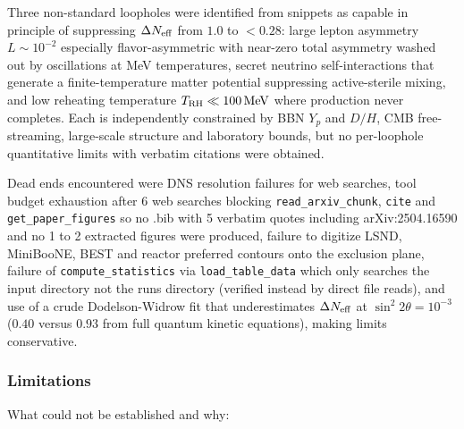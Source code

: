 \documentclass[11pt,a4paper]{article}
\begin{document}
Three non-standard loopholes were identified from snippets as capable in principle of suppressing $\Delta N_{\rm eff}$ from $1.0$ to $<0.28$: large lepton asymmetry $L \sim 10^{-2}$ especially flavor-asymmetric with near-zero total asymmetry washed out by oscillations at MeV temperatures, secret neutrino self-interactions that generate a finite-temperature matter potential suppressing active-sterile mixing, and low reheating temperature $T_{\rm RH} \ll 100\,\mathrm{MeV}$ where production never completes. Each is independently constrained by BBN $Y_p$ and $D/H$, CMB free-streaming, large-scale structure and laboratory bounds, but no per-loophole quantitative limits with verbatim citations were obtained.

Dead ends encountered were DNS resolution failures for web searches, tool budget exhaustion after 6 web searches blocking \texttt{read\_\allowbreak{}arxiv\_\allowbreak{}chunk}, \texttt{cite} and \texttt{get\_\allowbreak{}paper\_\allowbreak{}figures} so no .bib with 5 verbatim quotes including arXiv:2504.16590 and no 1 to 2 extracted figures were produced, failure to digitize LSND, MiniBooNE, BEST and reactor preferred contours onto the exclusion plane, failure of \texttt{compute\_\allowbreak{}statistics} via \texttt{load\_\allowbreak{}table\_\allowbreak{}data} which only searches the input directory not the runs directory (verified instead by direct file reads), and use of a crude Dodelson-Widrow fit that underestimates $\Delta N_{\rm eff}$ at $\sin^2 2\theta = 10^{-3}$ ($0.40$ versus $0.93$ from full quantum kinetic equations), making limits conservative.

\subsubsection*{Limitations}
What could not be established and why:
\end{document}
